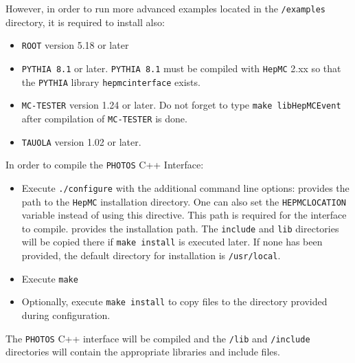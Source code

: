 \documentclass[]{Photos_interface_design}
\begin{document}
However, in order to run more advanced examples located in the {\tt /examples} directory, it is required to install also:

\begin{itemize}
  \item {\tt ROOT} \cite{root-install-www} version 5.18 or later
  \item {\tt PYTHIA 8.1} \cite{Sjostrand:2007gs} or later. {\tt PYTHIA 8.1} must be compiled with {\tt HepMC} 2.xx
        so that the {\tt PYTHIA} library {\tt hepmcinterface} exists.
  \item {\tt MC-TESTER} \cite{Golonka:2002rz,Davidson:2008ma} version 1.24 or later.
        Do not forget to type {\tt make libHepMCEvent} after compilation of {\tt MC-TESTER} is done.
  \item {\tt TAUOLA} \cite{Davidson:2010rw} version 1.02 or later.
\end{itemize}

In order to compile the {\tt PHOTOS} C++ Interface:
\begin{itemize}
 \item Execute {\tt ./configure} with the additional command line options:
    provides the path to the {\tt HepMC} installation directory. One can also set the {\tt HEPMCLOCATION} variable instead of using this directive. This path is required for the interface to compile.
    provides the installation path. The {\tt include} and {\tt lib} directories will be copied there if {\tt make install} is executed later. If none has been provided, the default directory for installation is {\tt /usr/local}.
 \item Execute {\tt make}
 \item Optionally, execute {\tt make install} to copy files to the directory provided during configuration.
\end{itemize}

The {\tt PHOTOS} C++ interface will be compiled and the {\tt /lib} and {\tt /include} directories will contain the appropriate libraries and include files.
\end{document}
